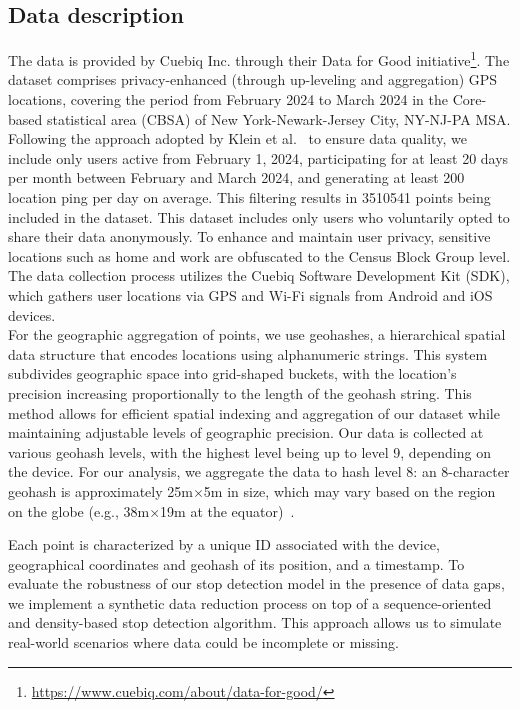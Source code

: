 \documentclass{article}
\begin{document}
\subsection{Data description}
The data is provided by Cuebiq Inc. through their Data for Good initiative\footnote{\url{https://www.cuebiq.com/about/data-for-good/}}.
The dataset comprises privacy-enhanced (through up-leveling and aggregation) GPS locations, covering the period from February 2024 to March 2024 in the Core-based statistical area (CBSA) of New York-Newark-Jersey City, NY-NJ-PA MSA. Following the approach adopted by Klein et al.~\citep{Klein2023} to ensure data quality, we include only users active from February 1, 2024, participating for at least 20 days per month between February and March 2024, and generating at least 200 location ping per day on average. This filtering results in 3510541 points being included in the dataset. This dataset includes only users who voluntarily opted to share their data anonymously. To enhance and maintain user privacy, sensitive locations such as home and work are obfuscated to the Census Block Group level. The data collection process utilizes the Cuebiq Software Development Kit (SDK), which gathers user locations via GPS and Wi-Fi signals from Android and iOS devices.\\
For the geographic aggregation of points, we use geohashes, a hierarchical spatial data structure that encodes locations using alphanumeric strings. This system subdivides geographic space into grid-shaped buckets, with the location's precision increasing proportionally to the length of the geohash string. This method allows for efficient spatial indexing and aggregation of our dataset while maintaining adjustable levels of geographic precision.
Our data is collected at various geohash levels, with the highest level being up to level 9, depending on the device.
For our analysis, we aggregate the data to hash level 8: an 8-character geohash is approximately 25m$\times$5m in size, which may vary based on the region on the globe (e.g., 38m$\times$19m at the equator)~\citep{geohash}.

Each point is characterized by a unique ID associated with the device, geographical coordinates and geohash of its position, and a timestamp.
To evaluate the robustness of our stop detection model in the presence of data gaps, we implement a synthetic data reduction process on top of a sequence-oriented and density-based stop detection algorithm. This approach allows us to simulate real-world scenarios where data could be incomplete or missing.
\end{document}
